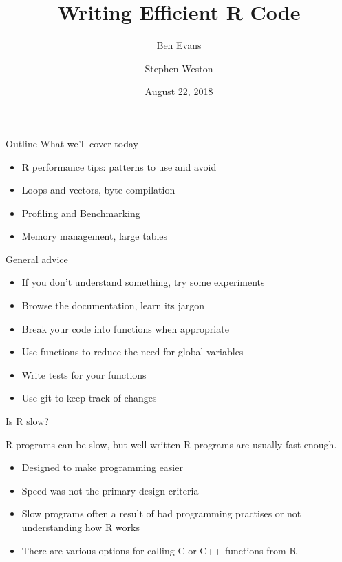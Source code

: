 \documentclass[ignorenonframetext,]{beamer}
\title{Writing Efficient R Code}
\author{Ben Evans \and Stephen Weston}
\institute{YCRC}
\date{August 22, 2018}
\providecommand{\tightlist}{%
  \setlength{\itemsep}{0pt}\setlength{\parskip}{0pt}}
\begin{document}
\frame{\titlepage}

\begin{frame}{Outline \textbar{} What we'll cover today}

\begin{itemize}
\tightlist
\item
  R performance tips: patterns to use and avoid
\item
  Loops and vectors, byte-compilation
\item
  Profiling and Benchmarking
\item
  Memory management, large tables
\end{itemize}

\end{frame}

\begin{frame}{General advice}

\begin{itemize}
\tightlist
\item
  If you don't understand something, try some experiments
\item
  Browse the documentation, learn its jargon
\item
  Break your code into functions when appropriate
\item
  Use functions to reduce the need for global variables
\item
  Write tests for your functions
\item
  Use git to keep track of changes
\end{itemize}

\end{frame}

\begin{frame}{Is R slow?}

R programs can be slow, but well written R programs are usually fast
enough.

\begin{itemize}
\tightlist
\item
  Designed to make programming easier
\item
  Speed was not the primary design criteria
\item
  Slow programs often a result of bad programming practises or not
  understanding how R works
\item
  There are various options for calling C or C++ functions from R
\end{itemize}

\end{frame}
\end{document}
